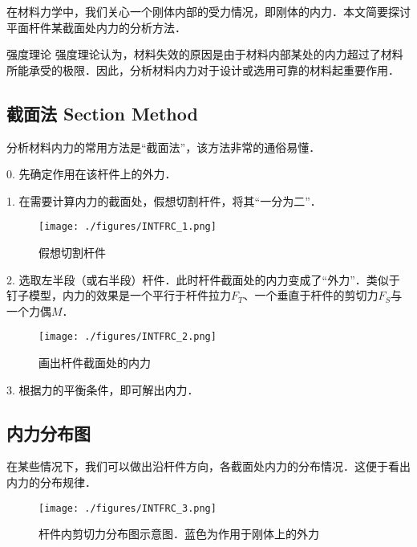 在材料力学中，我们关心一个刚体内部的受力情况，即刚体的内力．本文简要探讨平面杆件某截面处内力的分析方法．

\begin{example}{强度理论}
强度理论认为，材料失效的原因是由于材料内部某处的内力超过了材料所能承受的极限．因此，分析材料内力对于设计或选用可靠的材料起重要作用．
\end{example}

\subsection{截面法 Section Method}
分析材料内力的常用方法是“截面法”，该方法非常的通俗易懂．

0. 先确定作用在该杆件上的外力．

1. 在需要计算内力的截面处，假想切割杆件，将其“一分为二”．
\begin{figure}[ht]
\centering
\texttt{[image: ./figures/INTFRC\_1.png]}
\caption{假想切割杆件} \label{INTFRC_fig1}
\end{figure}

2. 选取左半段（或右半段）杆件．此时杆件截面处的内力变成了“外力”．类似于钉子模型，内力的效果是一个平行于杆件拉力$F_T$、一个垂直于杆件的剪切力$F_S$与一个力偶$M$．
\begin{figure}[ht]
\centering
\texttt{[image: ./figures/INTFRC\_2.png]}
\caption{画出杆件截面处的内力} \label{INTFRC_fig2}
\end{figure}

3. 根据力的平衡条件，即可解出内力．

\subsection{内力分布图}
在某些情况下，我们可以做出沿杆件方向，各截面处内力的分布情况．这便于看出内力的分布规律．
\begin{figure}[ht]
\centering
\texttt{[image: ./figures/INTFRC\_3.png]}
\caption{杆件内剪切力分布图示意图．蓝色为作用于刚体上的外力} \label{INTFRC_fig3}
\end{figure}
